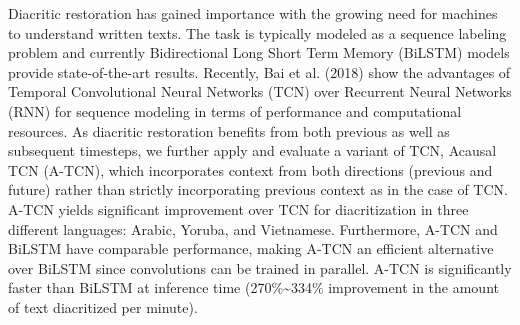 Diacritic restoration has gained importance with the growing need for machines to understand  written texts. The task is typically modeled as a sequence labeling problem and currently Bidirectional Long Short Term Memory (BiLSTM) models provide state-of-the-art results. Recently, Bai et al. (2018) show the advantages of Temporal Convolutional Neural Networks (TCN) over Recurrent Neural Networks (RNN) for sequence modeling in terms of performance and computational resources. As diacritic restoration benefits from both previous as well as subsequent timesteps, we further apply and evaluate a variant of TCN, Acausal TCN (A-TCN), which incorporates context from both directions (previous and future) rather than strictly incorporating previous context as in the case of TCN. A-TCN yields significant improvement over TCN for diacritization in three different languages: Arabic, Yoruba, and Vietnamese. Furthermore, A-TCN and BiLSTM have comparable performance, making A-TCN an efficient alternative over BiLSTM since convolutions can be trained in parallel. A-TCN is significantly faster than BiLSTM at inference time (270\%{\textasciitilde}334\% improvement in the amount of text diacritized per minute).